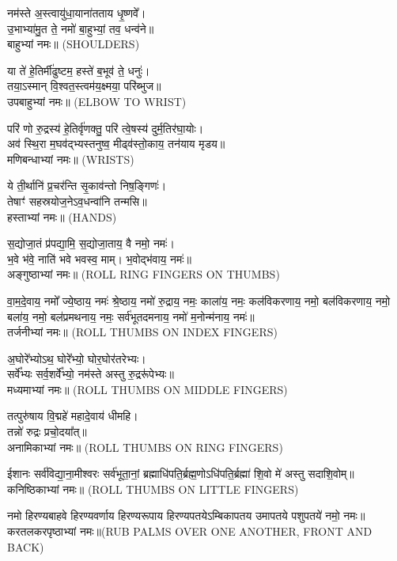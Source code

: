 नम॑स्ते अ॒स्त्वायु॑धा॒याना॑तताय धृ॒ष्णवे᳚।\\
उ॒भाभ्या॑मु॒त ते॒ नमो॑ बा॒हुभ्यां॒ तव॒ धन्व॑ने॥\\
बाहुभ्यां नमः॥ {\scriptsize (SHOULDERS)}

या ते॑ हे॒तिर्मी॑ढुष्टम॒ हस्ते॑ ब॒भूव॑ ते॒ धनुः॑।\\
तया॒ऽस्मान् वि॒श्वत॒स्त्वम॑य॒क्ष्मया॒ परि॑ब्भुज॥\\
उपबाहुभ्यां नमः॥ {\scriptsize (ELBOW TO WRIST)}

परि॑ णो रु॒द्रस्य॑ हे॒तिर्वृ॑णक्तु॒ परि॑ त्वे॒षस्य॑ दुर्म॒तिर॑घा॒योः।\\
अव॑ स्थि॒रा म॒घव॑द्भ्यस्तनुष्व॒ मीढ्व॑स्तो॒काय॒ तन॑याय मृडय॥\\
मणिबन्धाभ्यां नमः॥ {\scriptsize (WRISTS)}

ये ती॒र्थानि॑ प्र॒चर॑न्ति सृ॒काव॑न्तो निष॒ङ्गिणः॑।\\
तेषाꣳ॑ सहस्रयोज॒नेऽव॒धन्वा॑नि तन्मसि॥\\
हस्ताभ्यां नमः॥ {\scriptsize (HANDS)}

स॒द्योजा॒तं प्र॑पद्या॒मि॒ स॒द्योजा॒ताय॒ वै नमो॒ नमः॑।\\
भ॒वे भ॑वे॒ नाति॑ भवे भवस्व॒ माम्। भ॒वोद्भ॑वाय॒ नमः॑॥\\
अङ्गुष्ठाभ्यां नमः॥ {\scriptsize (ROLL RING FINGERS ON THUMBS)}

वा॒म॒दे॒वाय॒ नमो᳚ ज्ये॒ष्ठाय॒ नमः॑ श्रे॒ष्ठाय॒ नमो॑ रु॒द्राय॒ नमः॒ काला॑य॒ नमः॒ कल॑विकरणाय॒ नमो॒ बल॑विकरणाय॒ नमो॒ बला॑य॒ नमो॒ बल॑प्रमथनाय॒ नमः॒ सर्व॑भूतदमनाय॒ नमो॑ म॒नोन्म॑नाय॒ नमः॑॥\\
तर्जनीभ्यां नमः॥ {\scriptsize (ROLL THUMBS ON INDEX FINGERS)}

अ॒घोरे᳚भ्योऽथ॒ घोरे᳚भ्यो॒ घोर॒घोर॑तरेभ्यः।\\
सर्वे᳚भ्यः सर्व॒शर्वे᳚भ्यो॒ नम॑स्ते अस्तु रु॒द्ररू॑पेभ्यः॥\\
मध्यमाभ्यां नमः॥ {\scriptsize (ROLL THUMBS ON MIDDLE FINGERS)}

तत्पुरु॑षाय वि॒द्महे॑ महादे॒वाय॑ धीमहि।\\
तन्नो॑ रुद्रः प्रचो॒दया᳚त्॥\\
अनामिकाभ्यां नमः॥ {\scriptsize (ROLL THUMBS ON RING FINGERS)}

ईशानः सर्व॑विद्या॒ना॒मीश्वरः सर्व॑भूता॒नां॒ ब्रह्माधि॑पति॒र्ब्रह्म॒णो\-ऽधि॑पति॒र्ब्रह्मा॑ शि॒वो मे॑ अस्तु सदाशि॒वोम्॥\\
कनिष्ठिकाभ्यां नमः॥ {\scriptsize (ROLL THUMBS ON LITTLE FINGERS)}

नमो हिरण्यबाहवे हिरण्यवर्णाय हिरण्यरूपाय हिरण्यपतये\-ऽम्बिकापतय उमापतये पशुपतये॑ नमो॒ नमः॥\\
करतलकरपृष्ठाभ्यां नमः॥{\scriptsize (RUB PALMS OVER ONE ANOTHER, FRONT AND BACK)}

